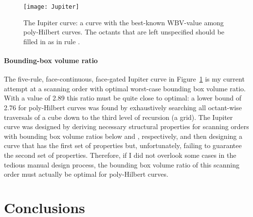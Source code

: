 \documentclass[11pt,a4paper]{article}
\def\WBV{\ensuremath{\mathrm{WBV}}\xspace}
\begin{document}
\begin{figure}
\centering
\texttt{[image: Jupiter]}
\caption{The Iupiter curve: a curve with the best-known \WBV-value among poly-Hilbert curves. The octants that are left unspecified should be filled in as in rule .}
\label{fig:jupiter}
\end{figure}

\paragraph{Bounding-box volume ratio}
The five-rule, face-continuous, face-gated Iupiter curve in Figure~\ref{fig:jupiter} is my current attempt at a scanning order with optimal worst-case bounding box volume ratio. With a value of 2.89 this ratio must be quite close to optimal: a lower bound of 2.76 for poly-Hilbert curves was found by exhaustively searching all octant-wise traversals of a cube down to the third level of recursion (a  grid). The Iupiter curve was designed by deriving necessary structural properties for scanning orders with bounding box volume ratios below  and , respectively, and then designing a curve that has the first set of properties but, unfortunately, failing to guarantee the second set of properties.
Therefore, if I did not overlook some cases in the tedious manual design process, the bounding box volume ratio of this scanning order must actually be optimal for poly-Hilbert curves.




\section{Conclusions}
\end{document}
